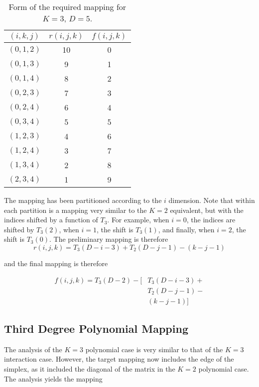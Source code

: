 \documentclass[journal]{journal}
\begin{document}
\begin{table}
  \caption{Form of the required mapping for $K=3$, $D=5$.}
  \begin{tabular}{| c | c | c |}
    \hline
    $(i, k, j)$ & $r(i,j,k)$ & $f(i,j,k)$ \\
    \hline
    $(0, 1, 2)$ & 10 & 0 \\
    $(0, 1, 3)$ & 9 & 1 \\
    $(0, 1, 4)$ & 8 & 2 \\
    $(0, 2, 3)$ & 7 & 3 \\
    $(0, 2, 4)$ & 6 & 4 \\
    $(0, 3, 4)$ & 5 & 5 \\
    \hline
    $(1, 2, 3)$ & 4 & 6 \\
    $(1, 2, 4)$ & 3 & 7 \\
    $(1, 3, 4)$ & 2 & 8 \\
    \hline
    $(2, 3, 4)$ & 1 & 9 \\
    \hline  
  \end{tabular}
\end{table}

The mapping has been partitioned according to the $i$ dimension.
Note that within each partition is a mapping very similar to the $K=2$ equivalent, but with the indices shifted by a function of $T_3$.
For example, when $i=0$, the indices are shifted by $T_3(2)$, when $i=1$, the shift is $T_3(1)$, and finally, when $i=2$, the shift is $T_3(0)$.
The preliminary mapping is therefore
\begin{equation}
r(i, j, k) = T_3(D-i-3) + T_2(D-j-1) - (k-j-1)
\end{equation}

and the final mapping is therefore

\begin{align}
f(i, j, k) = T_3(D-2) - [&T_3(D-i-3) + \\
                         &T_2(D-j-1) - \\
                         &(k-j-1)]
\end{align}

\subsection{Third Degree Polynomial Mapping}
The analysis of the $K=3$ polynomial case is very similar to that of the $K=3$ interaction case.
However, the target mapping now includes the edge of the simplex, as it included the diagonal of the matrix in the $K=2$ polynomial case.
The analysis yields the mapping
\end{document}
